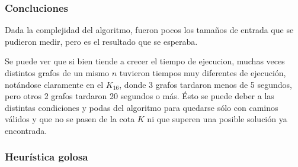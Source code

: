 \subsubsection{Concluciones}
Dada la complejidad del algoritmo, fueron pocos los tama\~nos de entrada que se pudieron medir, pero es el resultado que se esperaba.

Se puede ver que si bien tiende a crecer el tiempo de ejecucion, muchas veces distintos grafos de un mismo $n$ tuvieron tiempos muy diferentes de ejecuci\'on, not\'andose claramente en el $K_{16}$, donde 3 grafos tardaron menos de 5 segundos, pero otros 2 grafos tardaron 20 segundos o m\'as. \'Esto se puede deber a las distintas condiciones y podas del algoritmo para quedarse s\'olo con caminos v\'alidos y que no se pasen de la cota $K$ ni que superen una posible soluci\'on ya encontrada.

\subsubsection{Heur\'istica golosa}
